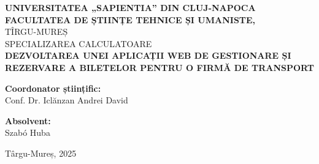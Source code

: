 \begin{titlepage}
    \centering
    \vspace*{2cm}

    {\Large \textbf{UNIVERSITATEA „SAPIENTIA” DIN CLUJ-NAPOCA}}\\[0.2cm]
    {\Large \textbf{FACULTATEA DE ȘTIINȚE TEHNICE ȘI UMANISTE,}}\\[0.5cm]
    {\large TÎRGU-MUREȘ}\\[0.2cm]
    {\large  SPECIALIZAREA CALCULATOARE}\\[3cm]

    {\LARGE \textbf{DEZVOLTAREA UNEI APLICAȚII WEB DE GESTIONARE ȘI REZERVARE A BILETELOR PENTRU O FIRMĂ DE TRANSPORT}}\\[4cm] 
    

    \noindent
\begin{minipage}[t]{0.48\textwidth}
    \raggedright
    \textbf{Coordonator științific:}\\[1em]
    Conf. Dr. Iclănzan Andrei David
\end{minipage}
\hfill
\begin{minipage}[t]{0.48\textwidth}
    \raggedleft
    \textbf{Absolvent:}\\[1em]
    Szabó Huba
\end{minipage}


    \vfill

    {\large  Târgu-Mureș, 2025}

\end{titlepage}
